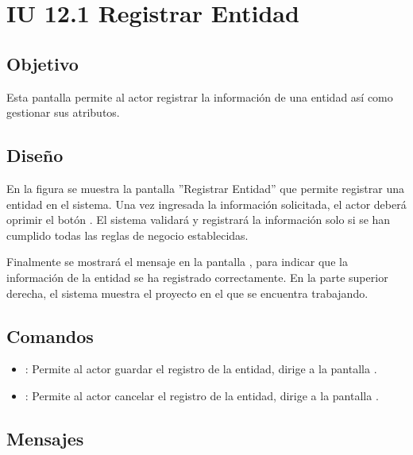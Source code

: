 \section{IU 12.1 Registrar Entidad}

\subsection{Objetivo}
	Esta pantalla permite al actor registrar la información de una entidad así como gestionar sus atributos.
\subsection{Diseño}
	En la figura  se muestra la pantalla ''Registrar Entidad'' que permite registrar una entidad en el sistema.
	Una vez ingresada la información solicitada, el actor deberá oprimir el botón  . El sistema validará y registrará la información solo si se han cumplido todas las reglas de negocio establecidas.
	
	Finalmente se mostrará el mensaje  en la pantalla , para indicar que la información de la entidad se ha registrado correctamente.
	En la parte superior derecha, el sistema muestra el proyecto en el que se encuentra trabajando.

\subsection{Comandos}
\begin{itemize}
	\item {}: Permite al actor guardar el registro de la entidad, dirige a la pantalla .
	\item {}: Permite al actor cancelar el registro de la entidad, dirige a la pantalla .
\end{itemize}

\subsection{Mensajes}

